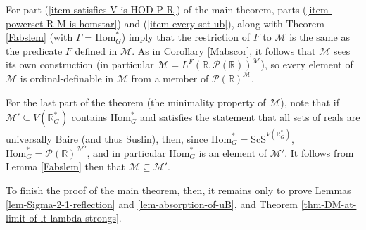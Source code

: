 \documentclass[fleqn, 11pt]{amsart}
\theoremstyle{plain}
\theoremstyle{definition}
\theoremstyle{remark}
\newcommand{\HOD}{\mathrm{HOD}}
\newcommand{\Hom}{\mathrm{Hom}}
\newcommand{\ScS}{\mathrm{ScS}}
\newcommand{\bbR}{\mathbb{R}}
\newcommand{\powerset}{\mathcal{P}}
\begin{document}
For part (\ref{item-satisfies-V-is-HOD-P-R}) of the main theorem, parts (\ref{item-powerset-R-M-is-homstar}) and (\ref{item-every-set-ub}), along with Theorem \ref{Fabslem} (with $\Gamma = \Hom^{*}_{G}$) imply that the restriction of $F$ to $\mathcal{M}$ is the same as the predicate $F$ defined in $\mathcal{M}$. As in Corollary \ref{Mabscor}, it follows that $\mathcal{M}$ sees its own construction (in particular $\mathcal{M}= L^{F}(\bbR, \mathcal{P}(\bbR))^{\mathcal{M}}$), so every element of $\mathcal{M}$ is ordinal-definable in $\mathcal{M}$ from a member of $\mathcal{P}(\bbR)^{\mathcal{M}}$. 


For the last part of the theorem (the minimality property of $\mathcal{M}$), note that if $\mathcal{M}' \subseteq V(\bbR^{*}_{G})$ contains $\Hom^{*}_{G}$ and satisfies the statement that all sets of reals are universally Baire (and thus Suslin), then, since $\Hom^{*}_{G} = \ScS^{V(\bbR^{*}_{G})}$, $\Hom^{*}_{G} = \mathcal{P}(\bbR)^{\mathcal{M}'}$, and in particular $\Hom^{*}_{G}$ is an element of $\mathcal{M}'$. It follows from Lemma \ref{Fabslem} then that $\mathcal{M} \subseteq \mathcal{M}'$. 



% 
% 
% 
% 

To finish the proof of the main theorem, then, it remains only to prove Lemmas \ref{lem-Sigma-2-1-reflection} and \ref{lem-absorption-of-uB}, and Theorem \ref{thm-DM-at-limit-of-lt-lambda-strongs}. 
\end{document}
